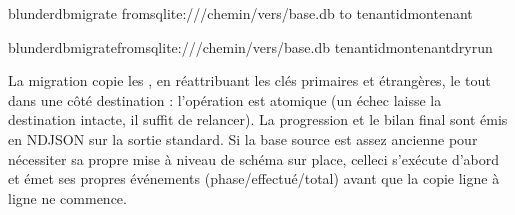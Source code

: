 \documentclass[letterpaper,10pt,german]{sphinxmanual}
\begin{document}
\begin{sphinxVerbatim}[commandchars=\\\{\}]
blunderdbmigrate
\PYGZhy{}\PYGZhy{}fromsqlite:///chemin/vers/base.db
\PYGZhy{}\PYGZhy{}to
\PYGZhy{}\PYGZhy{}tenant\PYGZhy{}idmon\PYGZhy{}tenant

blunderdbmigrate\PYGZhy{}\PYGZhy{}fromsqlite:///chemin/vers/base.db
\PYGZhy{}\PYGZhy{}tenant\PYGZhy{}idmon\PYGZhy{}tenant\PYGZhy{}\PYGZhy{}dry\PYGZhy{}run
\end{sphinxVerbatim}

\sphinxAtStartPar
La migration copie les , en réattribuant les clés primaires et étrangères, le
tout dans une  côté destination : l’opération est atomique
(un échec laisse la destination intacte, il suffit de relancer). La progression
et le bilan final sont émis en NDJSON sur la sortie standard. Si la base source
est assez ancienne pour nécessiter sa propre mise à niveau de schéma sur place,
celle\sphinxhyphen{}ci s’exécute d’abord et émet ses propres événements
 (phase/effectué/total) avant que la copie ligne à ligne
ne commence.
\end{document}
